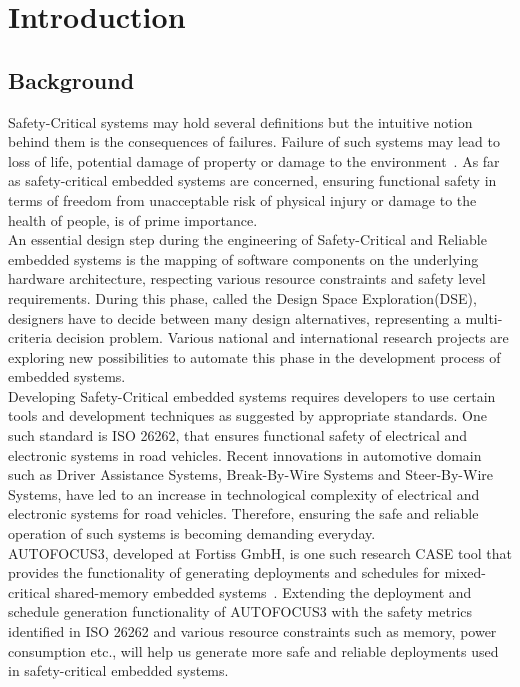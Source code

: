 \chapter{Introduction}\label{chapter:introduction}

\section{Background}

Safety-Critical systems may hold several definitions but the intuitive notion behind them is the consequences of failures. Failure of such systems may lead to loss of life, potential damage of property or damage to the environment~\cite{Knight:2002:SCS:581339.581406}. As far as safety-critical embedded systems are concerned, ensuring functional safety in terms of freedom from unacceptable risk of physical injury or damage to the health of people, is of prime importance.\\

An essential design step during the engineering of Safety-Critical and Reliable embedded systems is the mapping of software components on the underlying hardware architecture, respecting various resource constraints and safety level requirements. During this phase, called the Design Space Exploration(DSE), designers have to decide between many design alternatives, representing a multi-criteria decision problem. Various national and international research projects are exploring new possibilities to automate this phase in the development process of embedded systems.\\

Developing Safety-Critical embedded systems requires developers to use certain tools and development techniques as suggested by appropriate standards. One such standard is ISO 26262, that ensures functional safety of electrical and electronic systems in road vehicles. Recent innovations in automotive domain such as Driver Assistance Systems, Break-By-Wire Systems and Steer-By-Wire Systems, have led to an increase in technological complexity of electrical and electronic systems for road vehicles. Therefore, ensuring the safe and reliable operation of such systems is becoming demanding everyday.\\

AUTOFOCUS3, developed at Fortiss GmbH, is one such research CASE tool that provides the functionality of generating deployments and schedules for mixed-critical shared-memory embedded systems~\cite{6601578}. Extending the deployment and schedule generation functionality of AUTOFOCUS3 with the safety metrics identified in ISO 26262 and various resource constraints such as memory, power consumption etc., will help us generate more safe and reliable deployments used in safety-critical embedded systems.\\

